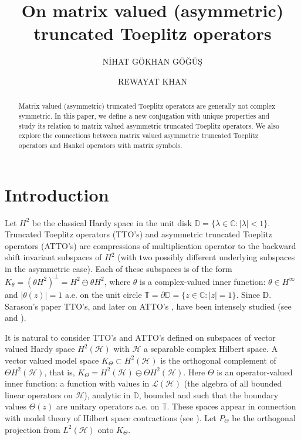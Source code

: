 \documentclass[12pt]{amsart}
\title[ MATTO's and Conjugations]{On matrix valued (asymmetric) truncated Toeplitz operators}
\author[N. G. Göğüş]{NİHAT GÖKHAN GÖĞÜŞ}
\author[R. Khan]{REWAYAT KHAN}
\numberwithin{equation}{section}
\newcommand{\hsp}{\mathcal{H}}
\newcommand{\oL }{\mathcal{L}(\hsp) }
\newcommand{\z}{{z}}
\theoremstyle{definition}
\numberwithin{equation}{section}
\begin{document}
\begin{abstract}{ Matrix valued (asymmetric) truncated Toeplitz operators are generally not complex symmetric. In this paper, we define a new conjugation with unique properties and study its relation to matrix valued asymmetric truncated Toeplitz operators. We also explore the connections between matrix valued asymmetric truncated Toeplitz operators and Hankel operators with matrix symbols.
	}
\end{abstract}
\maketitle



\section{\bf{Introduction}}

Let $H^2$ be the classical Hardy space in the unit disk $\mathbb{D}=\{\lambda\in\mathbb{C}:|\lambda|<1\}$. Truncated Toeplitz operators (TTO's) and asymmetric truncated Toeplitz operators (ATTO's) are compressions of multiplication operator to the backward shift invariant subspaces of $H^2$ (with two possibly different underlying subspaces in the asymmetric case). Each of these subspaces is of the form $K_{\theta}=(\theta H^{2})^{\perp}=H^2\ominus \theta H^2$, where $\theta$ is a complex-valued inner function: $\theta\in H^\infty$ and $|\theta(\z)|=1$ a.e. on the unit circle $\mathbb{T}=\partial\mathbb{D}=\{\z\in\mathbb{C}: |\z|=1\}$. Since D. Sarason's paper \cite{sar} TTO's, and later on ATTO's \cite{part,part2, BCKP}, have been intensely studied (see \cite{BCT,ChFT,cg,GMR,gar3, sed} and \cite{CKP, BM,blicharz1, jl,jurasik,l,l2}).

It is natural to consider TTO's and ATTO's defined on subspaces of vector valued Hardy space $H^2(\hsp)$ with $\hsp$ a separable complex Hilbert space. %
 A vector valued model space $K_{\Theta}\subset H^{2}(\hsp)$ is the orthogonal complement of $\Theta H^{2}(\hsp)$, that is, $K_{\Theta}= H^{2}(\hsp)\ominus  \Theta H^{2}(\hsp)$. Here $\Theta$ is an operator-valued inner function: a function with values in $\oL $ (the algebra of all bounded linear operators on $\hsp$), analytic in $\mathbb{D}$, bounded and such that the boundary values $\Theta(\z)$ are unitary operators a.e. on $\mathbb{T}$. These spaces appear in connection with model theory of Hilbert space contractions (see \cite{NF}). Let $P_{\Theta}$ be the orthogonal projection from $L^2(\hsp)$ onto $K_{\Theta}$.
\end{document}
